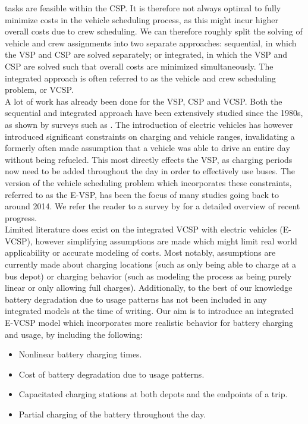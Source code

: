 \documentclass[]{article}
\begin{document}
tasks are feasible within the CSP. It is therefore not always optimal to
fully minimize costs in the vehicle scheduling process, as this might incur
higher overall costs due to crew scheduling. We can therefore roughly split the
solving of vehicle and crew assignments into two separate approaches:
sequential, in which the VSP and CSP are solved separately; or integrated, in
which the VSP and CSP are solved such that overall costs are minimized
simultaneously. The integrated approach is often referred to as the vehicle and
crew scheduling problem, or VCSP. \\
A lot of work has already been done for the VSP, CSP and VCSP.
Both the sequential and integrated approach have been extensively studied since the 1980s, as shown by surveys such as \citet{Bodin1983}. The introduction of electric vehicles has however introduced significant constraints on charging and vehicle ranges, invalidating a formerly often made assumption that a vehicle was able to drive an entire day without being refueled. This most directly effects the VSP, as charging periods now need to be added throughout the day in order to
effectively use buses. The version of the vehicle scheduling problem which incorporates these constraints, referred to as the
E-VSP, has been the focus of many studies going back to around 2014. We refer the reader
to a survey by \citet{Perumal2022LitRev} for a detailed overview of recent progress. \\
Limited literature does exist on the integrated VCSP with electric vehicles (E-VCSP), however
simplifying assumptions are made which might limit real world applicability or
accurate modeling of costs. Most notably, assumptions are currently made about charging
locations (such as only being able to charge at a bus depot) or charging
behavior (such as modeling the process as being purely linear or only allowing
full charges). Additionally, to the best of our knowledge battery degradation
due to usage patterns has not been included in any integrated models at the
time of writing. Our aim is to introduce an integrated E-VCSP model which incorporates more realistic behavior for battery charging and usage, by including the following:
\begin{itemize}
  \item Nonlinear battery charging times.
  \item Cost of battery degradation due to usage patterns.
  \item Capacitated charging stations at both depots and the endpoints of a trip.
  \item Partial charging of the battery throughout the day.
\end{itemize}
\end{document}
